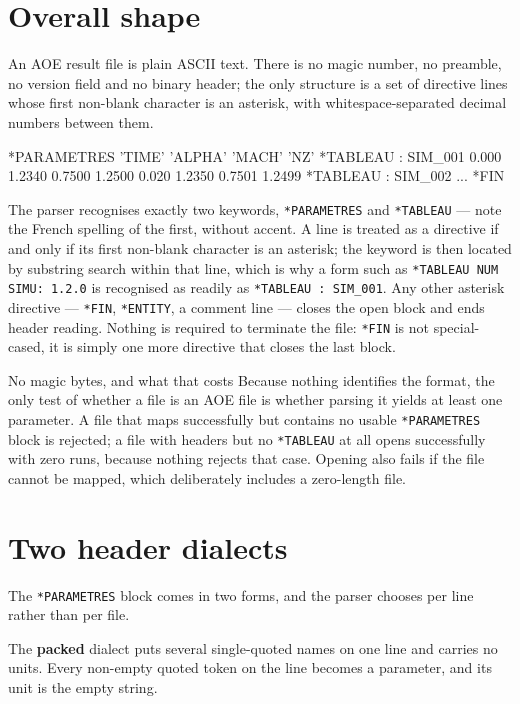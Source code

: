 \documentclass[11pt,a4paper,oneside]{report}
\newcommand{\code}[1]{\texttt{#1}}
\begin{document}
\section{Overall shape}

An AOE result file is plain ASCII text. There is no magic number, no preamble, no
version field and no binary header; the only structure is a set of directive
lines whose first non-blank character is an asterisk, with whitespace-separated
decimal numbers between them.

\begin{aoecode}
*PARAMETRES
 'TIME'   'ALPHA'  'MACH'  'NZ'
*TABLEAU : SIM_001
 0.000 1.2340 0.7500 1.2500
 0.020 1.2350 0.7501 1.2499
*TABLEAU : SIM_002
 ...
*FIN
\end{aoecode}

The parser recognises exactly two keywords, \code{*PARAMETRES} and
\code{*TABLEAU} --- note the French spelling of the first, without accent. A line
is treated as a directive if and only if its first non-blank character is an
asterisk; the keyword is then located by substring search within that line, which
is why a form such as \code{*TABLEAU NUM SIMU: 1.2.0} is recognised as readily as
\code{*TABLEAU : SIM\_001}. Any other asterisk directive --- \code{*FIN},
\code{*ENTITY}, a comment line --- closes the open block and ends header reading.
Nothing is required to terminate the file: \code{*FIN} is not special-cased, it
is simply one more directive that closes the last block.

\begin{aoenote}{No magic bytes, and what that costs}
Because nothing identifies the format, the only test of whether a file is an AOE
file is whether parsing it yields at least one parameter. A file that maps
successfully but contains no usable \code{*PARAMETRES} block is rejected; a file
with headers but no \code{*TABLEAU} at all opens successfully with zero runs,
because nothing rejects that case. Opening also fails if the file cannot be
mapped, which deliberately includes a zero-length file.
\end{aoenote}

\section{Two header dialects}

The \code{*PARAMETRES} block comes in two forms, and the parser chooses per line
rather than per file.

The \textbf{packed} dialect puts several single-quoted names on one line and
carries no units. Every non-empty quoted token on the line becomes a parameter,
and its unit is the empty string.
\end{document}
